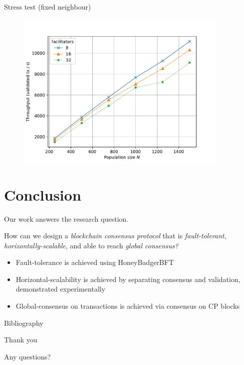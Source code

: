\documentclass{beamer}
\begin{document}
\begin{frame}{Stress test (fixed neighbour)}
  \begin{figure}[h]
  \includegraphics[width=0.9\textwidth]{throughput-vs-population-large}
  \centering
  \end{figure}
\end{frame}

\section{Conclusion}
\begin{frame}{\secname}
  Our work answers the research question.
  \begin{block}{}
    How can we design a \emph{blockchain consensus protocol} that is \emph{fault-tolerant},
    \emph{horizontally-scalable}, and able to reach \emph{global consensus?}
  \end{block}
  \begin{itemize}
    \item Fault-tolerance is achieved using HoneyBadgerBFT
    \item Horizontal-scalability is achieved by separating consensus and validation, demonstrated experimentally
    \item Global-consensus on transactions is achieved via consensus on CP blocks
  \end{itemize}
\end{frame}

\begin{frame}{Bibliography}
\printbibliography
\end{frame}

\begin{frame}{Thank you}
  \begin{center}
  {\Large Any questions?}
  \end{center}
\end{frame}
\end{document}
